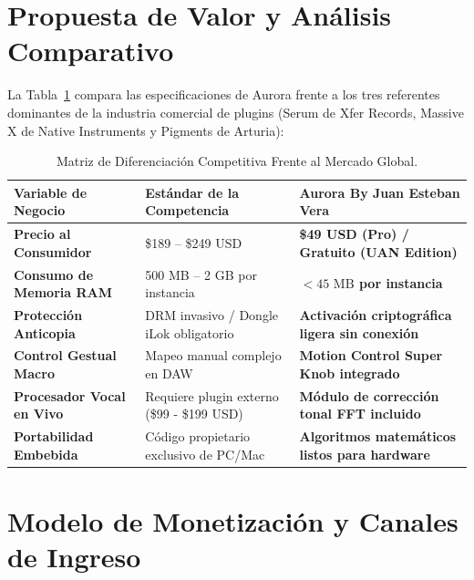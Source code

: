 \documentclass[11pt,a4paper]{article}
\begin{document}
\section{Propuesta de Valor y Análisis Comparativo}

La Tabla~\ref{tab:competitors} compara las especificaciones de Aurora frente a los tres referentes dominantes de la industria comercial de plugins (Serum de Xfer Records, Massive X de Native Instruments y Pigments de Arturia):

\begin{table}[h!]
\centering
\caption{Matriz de Diferenciación Competitiva Frente al Mercado Global.}
\label{tab:competitors}
\vspace{0.2cm}
{\footnotesize
\begin{tabular}{lp{4.2cm}p{4.8cm}}
\toprule
\textbf{Variable de Negocio} & \textbf{Estándar de la Competencia} & \textbf{Aurora By Juan Esteban Vera} \\
\midrule
\textbf{Precio al Consumidor} & \$189 – \$249 USD & \textbf{\$49 USD (Pro) / Gratuito (UAN Edition)} \\
\textbf{Consumo de Memoria RAM} & 500 MB – 2 GB por instancia & \textbf{$< 45\text{ MB}$ por instancia} \\
\textbf{Protección Anticopia} & DRM invasivo / Dongle iLok obligatorio & \textbf{Activación criptográfica ligera sin conexión} \\
\textbf{Control Gestual Macro} & Mapeo manual complejo en DAW & \textbf{Motion Control Super Knob integrado} \\
\textbf{Procesador Vocal en Vivo} & Requiere plugin externo (\$99 - \$199 USD) & \textbf{Módulo de corrección tonal FFT incluido} \\
\textbf{Portabilidad Embebida} & Código propietario exclusivo de PC/Mac & \textbf{Algoritmos matemáticos listos para hardware} \\
\bottomrule
\end{tabular}
}
\end{table}

\section{Modelo de Monetización y Canales de Ingreso}
\end{document}
